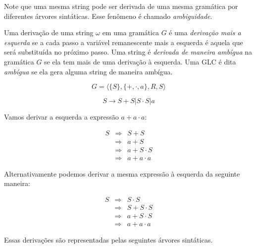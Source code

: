 Note que uma mesma string pode ser derivada de uma mesma gramática por diferentes árvores sintáticas.
Esse fenômeno é chamado {\em ambiguidade}.

Uma derivação de uma string $\omega$ em uma gramática $G$ é uma {\em derivação mais a esquerda} se a cada passo a variável remanescente mais a esquerda é aquela que será substituída no próximo passo.
Uma string é {\em derivada de maneira ambígua} na gramática $G$ se ela tem mais de uma derivação à esquerda.
Uma GLC é dita {\em ambígua} se ela gera alguma string de maneira ambígua.


\begin{example}
\begin{displaymath}
  G = \langle \{S\}, \{+, \cdot, a\}, R, S \rangle
\end{displaymath}

\begin{displaymath}
  S \to S + S | S \cdot S | a
\end{displaymath}

Vamos derivar a esquerda a expressão $a + a \cdot a$:

\begin{eqnarray*}
  S & \Rightarrow & S + S\\
    & \Rightarrow & a + S\\
    & \Rightarrow & a + S \cdot S\\
    & \Rightarrow & a + a \cdot a
\end{eqnarray*}

Alternativamente podemos derivar a mesma expressão à esquerda da seguinte maneira:

\begin{eqnarray*}
  S & \Rightarrow & S \cdot S\\
    & \Rightarrow & S + S \cdot S\\
    & \Rightarrow & a + S \cdot S\\
    & \Rightarrow & a + a \cdot a
\end{eqnarray*}

Essas derivações são representadas pelas seguintes árvores sintáticas.



\end{example}
